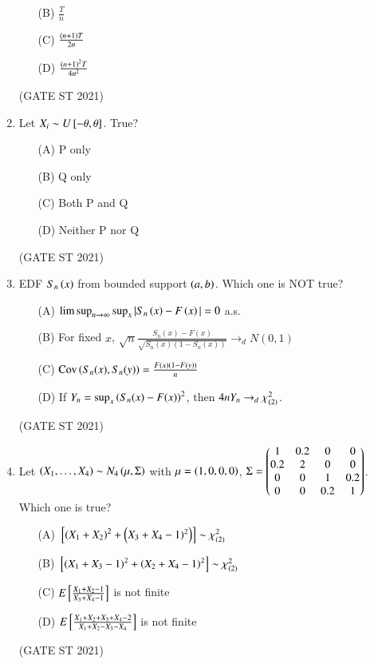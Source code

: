 \documentclass[journal,12pt,onecolumn]{IEEEtran}
\theoremstyle{remark}
\begin{document}
\begin{enumerate}
\begin{enumerate}
\item[(B)] $\frac{T}{n}$
\item[(C)] $\frac{\left(n+1\right)T}{2n}$
\item[(D)] $\frac{\left(n+1\right)^2T}{4n^2}$
\end{enumerate}
\hfill (GATE ST 2021) \\

\item
Let $X_i \sim U{}\left[-\theta,\theta\right]$. True?
\begin{enumerate}
\item[(A)] P only
\item[(B)] Q only
\item[(C)] Both P and Q
\item[(D)] Neither P nor Q
\end{enumerate}
\hfill (GATE ST 2021) \\
\item
EDF $S_n\left(x\right)$ from bounded support $\left(a,b\right)$. Which one is NOT true?
\begin{enumerate}
\item[(A)] $\limsup_{n\to\infty} \sup_x |S_n\left(x\right)-F\left(x\right)| = 0$ a.s.
\item[(B)] For fixed $x$, $\sqrt{n}\frac{S_n(x)-F(x)}{\sqrt{S_n(x)(1-S_n(x))}} \to_d N(0,1)$
\item[(C)] $\text{Cov}\left(S_n(x), S_n(y)\right) = \frac{F\left(x\right)\left(1-F\left(y\right)\right)}{n}$
\item[(D)] If $Y_n = \sup_x \left(S_n(x)-F(x)\right)^2$, then $4n Y_n \to_d \chi^2_{\left(2\right)}$.
\end{enumerate}
\hfill (GATE ST 2021) \\


\item
Let $\left(X_1,\dots,X_4\right) \sim N_4\left(\mu,\Sigma\right)$ with  
$\mu = \left(1,0,0,0\right)$, $\Sigma = \begin{pmatrix} 1 & 0.2 & 0 & 0 \\ 0.2 & 2 & 0 & 0 \\ 0 & 0 & 1 & 0.2 \\ 0 & 0 & 0.2 & 1 \end{pmatrix}$.  
Which one is true?
\begin{enumerate}
\item[(A)] ${}\left[\left(X_1+X_2\right)^2 + \left(X_3+X_4-1)^2\right)\right] \sim \chi^2_{(2)}$
\item[(B)] ${}\left[\left(X_1+X_3-1\right)^2 + \left(X_2+X_4-1\right)^2\right]\sim \chi^2_{(2)}$
\item[(C)] $E{}\left[\frac{X_1+X_2-1}{X_3+X_4-1}\right]$ is not finite
\item[(D)] $E{}\left[ \frac{X_1+X_2+X_3+X_4-2}{X_1+X_2-X_3-X_4} \right]$ is not finite
\end{enumerate}
\hfill (GATE ST 2021) \\


\end{enumerate}
\end{document}
